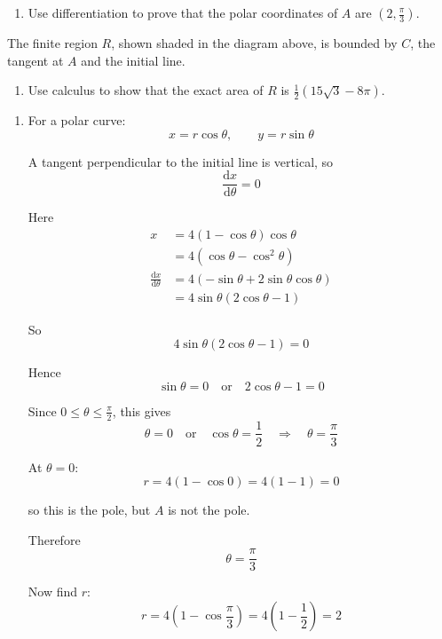 \documentclass[leqno]{article}
\begin{document}
\begin{enumerate}[
  label=\textbf{\arabic*.},
  leftmargin=*,
  topsep=0pt,
  partopsep=0pt,
  parsep=0pt
]
\begin{enumerate}[label=\textbf{(\alph*)}]
  \item Use differentiation to prove that the polar coordinates of $A$ are $\left(2, \frac{\pi}{3}\right)$.  \\
\end{enumerate}
The finite region $R$, shown shaded in the diagram above, is bounded by $C$, the tangent at $A$ and the initial line. \\
\begin{enumerate}[label=\textbf{(\alph*)}, resume]
  \item Use calculus to show that the exact area of $R$ is $\frac{1}{2}(15\sqrt{3} - 8\pi)$.  \\
\end{enumerate}

\vspace*{10pt}

\begin{djsSolution}
\begin{enumerate}[label=\textbf{(\alph*)}]
  \item For a polar curve:
\[
x=r\cos\theta,\qquad y=r\sin\theta
\]

A tangent perpendicular to the initial line is vertical, so
\[
\frac{\mathrm{d}x}{\mathrm{d}\theta}=0
\]

Here
\begin{align*}
x&=4(1-\cos\theta)\cos\theta \\
&=4(\cos\theta-\cos^2\theta) \\
\frac{\mathrm{d}x}{\mathrm{d}\theta}
&=4(-\sin\theta+2\sin\theta\cos\theta) \\
&=4\sin\theta(2\cos\theta-1)
\end{align*}

So
\[
4\sin\theta(2\cos\theta-1)=0
\]

Hence
\[
\sin\theta=0
\quad\text{or}\quad
2\cos\theta-1=0
\]

Since \(0\le \theta\le \frac{\pi}{2}\), this gives
\[
\theta=0
\quad\text{or}\quad
\cos\theta=\frac12\quad\Longrightarrow\quad\theta=\frac{\pi}{3}
\]

At \(\theta=0\):
\[
r=4(1-\cos 0)=4(1-1)=0
\]

so this is the pole, but \(A\) is not the pole.

Therefore
\[
\theta=\frac{\pi}{3}
\]

Now find \(r\):
\[
r=4\left(1-\cos\frac{\pi}{3}\right)=4\left(1-\frac12\right)=2
\]


\end{enumerate}
\end{djsSolution}
\end{enumerate}
\end{document}
